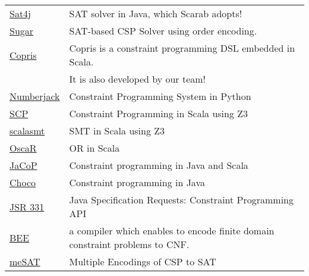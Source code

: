 \documentclass[11pt]{article}
\begin{document}
\begin{center}
\begin{tabular}{ll}
\href{http://www.sat4j.org}{Sat4j} & SAT solver in Java, which Scarab adopts!\\
\href{http://bach.istc.kobe-u.ac.jp/sugar/}{Sugar} & SAT-based CSP Solver using order encoding.\\
\href{http://bach.istc.kobe-u.ac.jp/copris/}{Copris} & Copris is a constraint programming DSL embedded in Scala.\\
 & It is also developed by our team!\\
\href{http://numberjack.ucc.ie}{Numberjack} & Constraint Programming System in Python\\
\href{http://lara.epfl.ch/web2010/scp}{SCP} & Constraint Programming in Scala using Z3\\
\href{http://code.google.com/p/scalasmt/}{scalasmt} & SMT in Scala using Z3\\
\href{https://bitbucket.org/oscarlib/oscar}{OscaR} & OR in Scala\\
\href{http://jacop.osolpro.com/}{JaCoP} & Constraint programming in Java and Scala\\
\href{http://www.emn.fr/x-info/choco-solver/}{Choco} & Constraint programming in Java\\
\href{http://jcp.org/en/jsr/detail?id\%3D331}{JSR 331} & Java Specification Requests: Constraint Programming API\\
\href{http://amit.metodi.me/research/bee/}{BEE} & a compiler which enables to encode finite domain constraint problems to CNF.\\
\href{http://jason.matf.bg.ac.rs/~mirkos/Mesat.html}{meSAT} & Multiple Encodings of CSP to SAT\\
\end{tabular}
\end{center}
\end{document}
